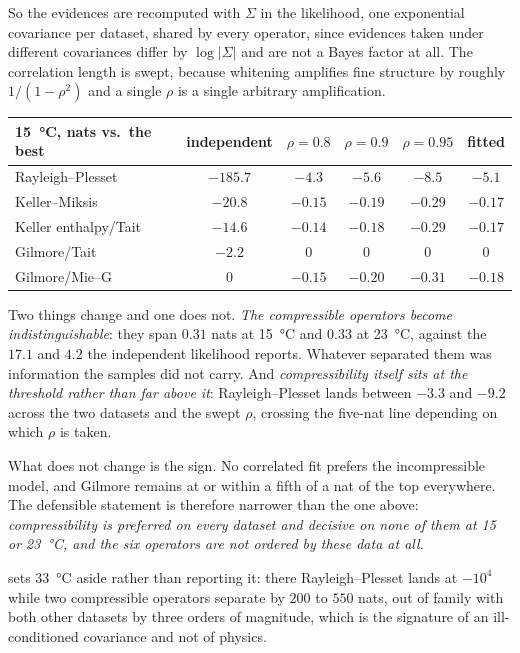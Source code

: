 \documentclass[10pt]{article}
\begin{document}
So the evidences are recomputed with $\Sigma$ in the likelihood, one exponential covariance
per dataset, shared by every operator, since evidences taken under different covariances differ
by $\log|\Sigma|$ and are not a Bayes factor at all. The correlation length is swept, because
whitening amplifies fine structure by roughly $1/(1-\rho^2)$ and a single $\rho$ is a single
arbitrary amplification.

\begin{center}
\begin{tabular}{lccccc}
\toprule
\SI{15}{\celsius}, nats vs.\ the best & independent & $\rho=0.8$ & $\rho=0.9$ & $\rho=0.95$ & fitted \\
\midrule
Rayleigh--Plesset & $-185.7$ & $\mathbf{-4.3}$ & $-5.6$ & $-8.5$ & $-5.1$ \\
Keller--Miksis & $-20.8$ & $-0.15$ & $-0.19$ & $-0.29$ & $-0.17$ \\
Keller enthalpy/Tait & $-14.6$ & $-0.14$ & $-0.18$ & $-0.29$ & $-0.17$ \\
Gilmore/Tait & $-2.2$ & $0$ & $0$ & $0$ & $0$ \\
Gilmore/Mie--G & $0$ & $-0.15$ & $-0.20$ & $-0.31$ & $-0.18$ \\
\bottomrule
\end{tabular}
\end{center}

\noindent Two things change and one does not. \emph{The compressible operators become
indistinguishable}: they span $0.31$ nats at \SI{15}{\celsius} and $0.33$ at \SI{23}{\celsius},
against the $17.1$ and $4.2$ the independent likelihood reports. Whatever separated them was
information the samples did not carry. And \emph{compressibility itself sits at the threshold
rather than far above it}: Rayleigh--Plesset lands between $-3.3$ and $-9.2$ across the two
datasets and the swept $\rho$, crossing the five-nat line depending on which $\rho$ is taken.

What does not change is the sign. No correlated fit prefers the incompressible model, and
Gilmore remains at or within a fifth of a nat of the top everywhere. The defensible statement is
therefore narrower than the one above: \emph{compressibility is preferred on every dataset and
decisive on none of them at \SI{15}{} or \SI{23}{\celsius}, and the six operators are not
ordered by these data at all.}

 sets \SI{33}{\celsius} aside rather than reporting it: there
Rayleigh--Plesset lands at $-10^4$ while two compressible operators separate by $200$ to $550$
nats, out of family with both other datasets by three orders of magnitude, which is the
signature of an ill-conditioned covariance and not of physics.
\end{document}
